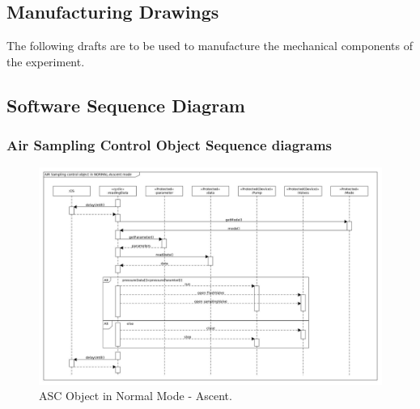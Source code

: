 \documentclass[a4paper,12pt,oneside]{article}
\begin{document}
\begin{appendices}
\newpage
\subsection{Manufacturing Drawings}
\label{sec:mech_drawings}

The following drafts are to be used to manufacture the mechanical components
of the experiment.


% 
% 





\newpage
\begin{landscape}
\subsection{Software Sequence Diagram} \label{sec:appB}

\subsubsection{Air Sampling Control Object Sequence diagrams}
\begin{figure}[H]
    \centering
    \includegraphics[height=0.75\textwidth]{appendix/img/softwareDiagrams/ASC-seq-dia-v1-3-ascent.jpg}
    \caption{ASC Object in Normal Mode - Ascent.}
    \label{ASCa}
\end{figure}


\end{landscape}
\end{appendices}
\end{document}
